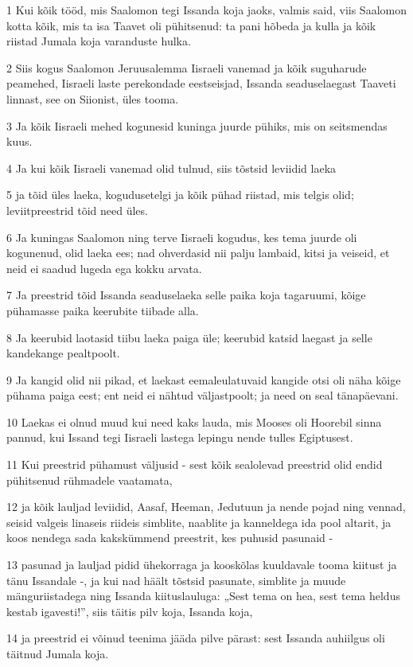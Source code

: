 \par 1 Kui kõik tööd, mis Saalomon tegi Issanda koja jaoks, valmis said, viis Saalomon kotta kõik, mis ta isa Taavet oli pühitsenud: ta pani hõbeda ja kulla ja kõik riistad Jumala koja varanduste hulka.
\par 2 Siis kogus Saalomon Jeruusalemma Iisraeli vanemad ja kõik suguharude peamehed, Iisraeli laste perekondade eestseisjad, Issanda seaduselaegast Taaveti linnast, see on Siionist, üles tooma.
\par 3 Ja kõik Iisraeli mehed kogunesid kuninga juurde pühiks, mis on seitsmendas kuus.
\par 4 Ja kui kõik Iisraeli vanemad olid tulnud, siis tõstsid leviidid laeka
\par 5 ja tõid üles laeka, kogudusetelgi ja kõik pühad riistad, mis telgis olid; leviitpreestrid tõid need üles.
\par 6 Ja kuningas Saalomon ning terve Iisraeli kogudus, kes tema juurde oli kogunenud, olid laeka ees; nad ohverdasid nii palju lambaid, kitsi ja veiseid, et neid ei saadud lugeda ega kokku arvata.
\par 7 Ja preestrid tõid Issanda seaduselaeka selle paika koja tagaruumi, kõige pühamasse paika keerubite tiibade alla.
\par 8 Ja keerubid laotasid tiibu laeka paiga üle; keerubid katsid laegast ja selle kandekange pealtpoolt.
\par 9 Ja kangid olid nii pikad, et laekast eemaleulatuvaid kangide otsi oli näha kõige pühama paiga eest; ent neid ei nähtud väljastpoolt; ja need on seal tänapäevani.
\par 10 Laekas ei olnud muud kui need kaks lauda, mis Mooses oli Hoorebil sinna pannud, kui Issand tegi Iisraeli lastega lepingu nende tulles Egiptusest.
\par 11 Kui preestrid pühamust väljusid - sest kõik sealolevad preestrid olid endid pühitsenud rühmadele vaatamata,
\par 12 ja kõik lauljad leviidid, Aasaf, Heeman, Jedutuun ja nende pojad ning vennad, seisid valgeis linaseis riideis simblite, naablite ja kanneldega ida pool altarit, ja koos nendega sada kakskümmend preestrit, kes puhusid pasunaid -
\par 13 pasunad ja lauljad pidid ühekorraga ja kooskõlas kuuldavale tooma kiitust ja tänu Issandale -, ja kui nad häält tõstsid pasunate, simblite ja muude mänguriistadega ning Issanda kiituslauluga: „Sest tema on hea, sest tema heldus kestab igavesti!”, siis täitis pilv koja, Issanda koja,
\par 14 ja preestrid ei võinud teenima jääda pilve pärast: sest Issanda auhiilgus oli täitnud Jumala koja.

